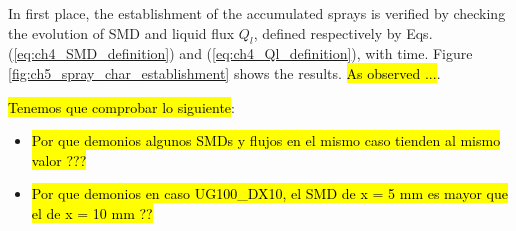 In first place, the establishment of the accumulated sprays is verified by checking the evolution of SMD and liquid flux $Q_l$, defined respectively by Eqs. (\ref{eq:ch4_SMD_definition}) and (\ref{eq:ch4_Ql_definition}), with time. Figure \ref{fig:ch5_spray_char_establishment} shows the results. \hl{As observed ...}.

\hl{Tenemos que comprobar lo siguiente}:

\begin{itemize}

	\item \hl{Por que demonios algunos SMDs y flujos en el mismo caso tienden al mismo valor ???}
	
	\item \hl{Por que demonios en caso UG100\_DX10, el SMD de x = 5 mm es mayor que el de x = 10 mm ??}

\end{itemize}

\clearpage

